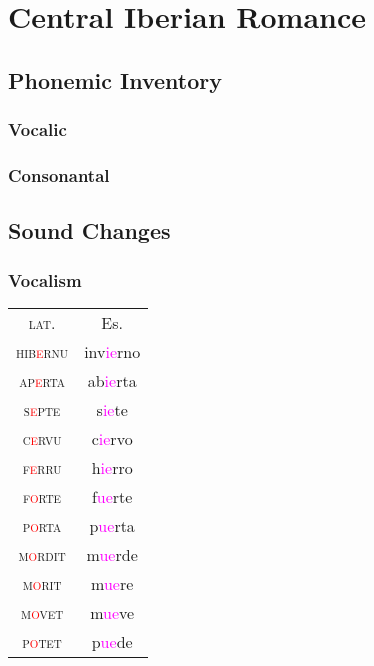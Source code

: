 \documentclass{report}
\begin{document}

\chapter{Central Iberian Romance}


\section{Phonemic Inventory}

\subsection{Vocalic}

\subsection{Consonantal}

\section{Sound Changes}

\subsection{Vocalism}

\begin{tcolorbox}[title=Diphthongization]
  
\end{tcolorbox}

\begin{tabular}{c c}
  \textsc{lat.} & Es. \\
  \textsc{hib\textcolor{red}{e}rnu} & inv\textcolor{magenta}{ie}rno \\
  \textsc{ap\textcolor{red}{e}rta} & ab\textcolor{magenta}{ie}rta \\
  \textsc{s\textcolor{red}{e}pte} & s\textcolor{magenta}{ie}te \\
  \textsc{c\textcolor{red}{e}rvu} & c\textcolor{magenta}{ie}rvo \\
  \textsc{f\textcolor{red}{e}rru} & h\textcolor{magenta}{ie}rro \\
  \textsc{f\textcolor{red}{o}rte} & f\textcolor{magenta}{ue}rte \\
  \textsc{p\textcolor{red}{o}rta} & p\textcolor{magenta}{ue}rta \\
  \textsc{m\textcolor{red}{o}rdit} & m\textcolor{magenta}{ue}rde \\
  \textsc{m\textcolor{red}{o}rit} & m\textcolor{magenta}{ue}re \\
  \textsc{m\textcolor{red}{o}vet} & m\textcolor{magenta}{ue}ve \\
  \textsc{p\textcolor{red}{o}tet} & p\textcolor{magenta}{ue}de \\
\end{tabular}
\end{document}
